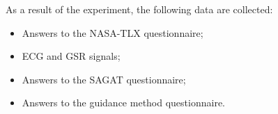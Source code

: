 As a result of the experiment, the following data are collected:

\begin{itemize}
    \item Answers to the NASA-TLX questionnaire;
    \item ECG and GSR signals;
    \item Answers to the SAGAT questionnaire;
    \item Answers to the guidance method questionnaire.
\end{itemize}


    
%        


%

